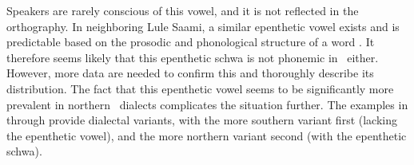Speakers are rarely conscious of this vowel, and it is not reflected in the orthography. In neighboring Lule Saami, a similar epenthetic vowel exists and is predictable based on the prosodic and phonological structure of a word \citep[cf.][14-15]{Spiik1989}. It therefore seems likely that this epenthetic schwa is not phonemic in \PS\ either. However, more data are needed to confirm this and thoroughly describe its distribution. The fact that this epenthetic vowel seems to be significantly more prevalent in northern \PS\ dialects complicates the situation further. The examples in  through  provide dialectal variants, with the more southern variant first (lacking the epenthetic vowel), and the more northern variant second (with the epenthetic schwa).
\ea\label{quick}
\z
\ea\label{deliciousPRED}
\z
\ea\label{whitefishNOMSG}
\z


